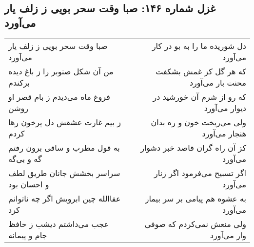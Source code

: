 \begin{center}
\section*{غزل شماره ۱۴۶: صبا وقت سحر بویی ز زلف یار می‌آورد}
\label{sec:sh146}
\begin{longtable}{l p{0.5cm} r}
صبا وقت سحر بویی ز زلف یار می‌آورد
&&
دل شوریده ما را به بو در کار می‌آورد
\\
من آن شکل صنوبر را ز باغ دیده برکندم
&&
که هر گل کز غمش بشکفت محنت بار می‌آورد
\\
فروغ ماه می‌دیدم ز بام قصر او روشن
&&
که رو از شرم آن خورشید در دیوار می‌آورد
\\
ز بیم غارت عشقش دل پرخون رها کردم
&&
ولی می‌ریخت خون و ره بدان هنجار می‌آورد
\\
به قول مطرب و ساقی برون رفتم گه و بی‌گه
&&
کز آن راه گران قاصد خبر دشوار می‌آورد
\\
سراسر بخشش جانان طریق لطف و احسان بود
&&
اگر تسبیح می‌فرمود اگر زنار می‌آورد
\\
عفاالله چین ابرویش اگر چه ناتوانم کرد
&&
به عشوه هم پیامی بر سر بیمار می‌آورد
\\
عجب می‌داشتم دیشب ز حافظ جام و پیمانه
&&
ولی منعش نمی‌کردم که صوفی وار می‌آورد
\\
\end{longtable}
\end{center}

